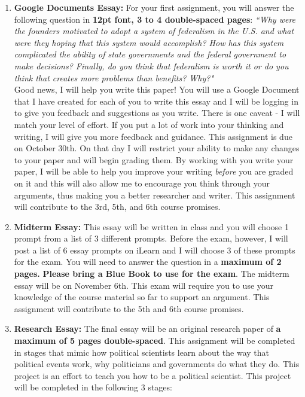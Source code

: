 \documentclass[11pt]{article}
\begin{document}
\begin{enumerate}
	\item \textbf{Google Documents Essay:} For your first assignment, you will answer the following question in \textbf{12pt font, 3 to 4 double-spaced pages}: \textit{``Why were the founders motivated to adopt a system of federalism in the U.S. and what were they hoping that this system would accomplish? How has this system complicated the ability of state governments and the federal government to make decisions? Finally, do you think that federalism is worth it or do you think that creates more problems than benefits? Why?"} \\ Good news, I will help you write this paper! You will use a Google Document that I have created for each of you to write this essay and I will be logging in to give you feedback and suggestions as you write. There is one caveat - I will match your level of effort. If you put a lot of work into your thinking and writing, I will give you more feedback and guidance.  {\color{red} This assignment is due on October 30th.} On that day I will restrict your ability to make any changes to your paper and will begin grading them. By working with you write your paper, I will be able to help you improve your writing \textit{before} you are graded on it and this will also allow me to encourage you think through your arguments, thus making you a better researcher and writer. This assignment will contribute to the 3rd, 5th, and 6th course promises. 
	\item \textbf{Midterm Essay:} This essay will be written in class and you will choose 1 prompt from a list of 3 different prompts. Before the exam, however, I will post a list of 6 essay prompts on iLearn and I will choose 3 of these prompts for the exam. You will need to answer the question in a \textbf{maximum of 2 pages.} \textbf{Please bring a Blue Book to use for the exam}. {\color{red} The midterm essay will be on November 6th.} This exam will require you to use your knowledge of the course material so far to support an argument. This assignment will contribute to the 5th and 6th course promises. 
	\item \textbf{Research Essay:} The final essay will be an original research paper of \textbf{a maximum of 5 pages double-spaced}. This assignment will be completed in stages that mimic how political scientists learn about the way that political events work, why politicians and governments do what they do. This project is an effort to teach you how to be a political scientist. This project will be completed in the following 3 stages:

\end{enumerate}
\end{document}
